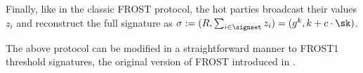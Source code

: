 
Finally, like in the classic FROST protocol, the hot parties broadcast their values $z_i$ and reconstruct the full signature as $\sigma := (R, \sum_{i \in \signset} z_i) = (g^k, k + c \cdot \sk)$.

\begin{remark}
    The above protocol can be modified in a straightforward manner to FROST1 threshold signatures, the original version of FROST introduced in \cite{SAC:KomGol20}.
\end{remark}